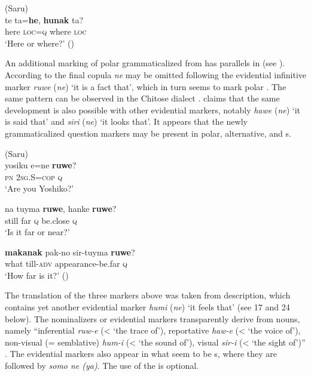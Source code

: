 \ea%
    \label{ex:ainu:7}
     (Saru)\\
    \gll te  ta=\textbf{{he}}, \textbf{{hunak}} ta?\\
    here  \textsc{loc}=\textsc{q}    where  \textsc{loc}\\
    \glt ‘Here or where?’ (\citealt{NINJAL2015})
    \z

\noindent An additional marking of polar  grammaticalized from  has parallels in  (see ). According to \citet[497]{Bugaeva2012} the final copula \textit{ne} may be omitted following the evidential infinitive marker \textit{ruwe} (\textit{ne}) ‘it is a fact that’, which in turn seems to mark polar . The same pattern can be observed in the Chitose dialect \citep[85]{Bugaeva2004}. \citet[233]{Tamura2000} claims that the same development is also possible with other evidential markers, notably \textit{hawe} (\textit{ne}) ‘it is said that’ and \textit{siri} (\textit{ne}) ‘it looks that’. It appears that the newly grammaticalized question markers may be present in polar, alternative, and s.

\ea%
    \label{ex:ainu:8}
     (Saru)\\
    \ea
    \gll yosiku  e=ne \textbf{{ruwe}}?\\
    \textsc{pn}  2\textsc{sg}.S=\textsc{cop}  \textsc{q}\\
    \glt ‘Are you Yoshiko?’ \citep[497]{Bugaeva2012}

    \ex
    \gll na  tuyma \textbf{{ruwe}},  hanke \textbf{{ruwe}}?\\
    still  far  \textsc{q}  be.close  \textsc{q}\\
    \glt ‘Is it far or near?’

    \ex
    \gll \textbf{{makanak}} pak-no    sir-tuyma \textbf{{ruwe}}?\\
    what    till-\textsc{adv}  appearance-be.far  \textsc{q}\\
    \glt ‘How far is it?’ (\citealt{NINJAL2015})
    \z
    \z 

\noindent The translation of the three markers above was taken from  description, which contains yet another evidential marker \textit{humi} (\textit{ne}) ‘it feels that’ (see 17 and 24 below). The nominalizers or evidential markers transparently derive from nouns, namely “inferential \textit{ruw-e} (< ‘the trace of’), reportative \textit{haw-e} (< ‘the voice of’), non-visual (= semblative) \textit{hum-i} (< ‘the sound of’), visual \textit{sir-i} (< ‘the sight of’)” \citep[470]{Bugaeva2012}. The evidential markers also appear in what seem to be s, where they are followed by \textit{somo ne (ya)}. The use of the  is optional.

